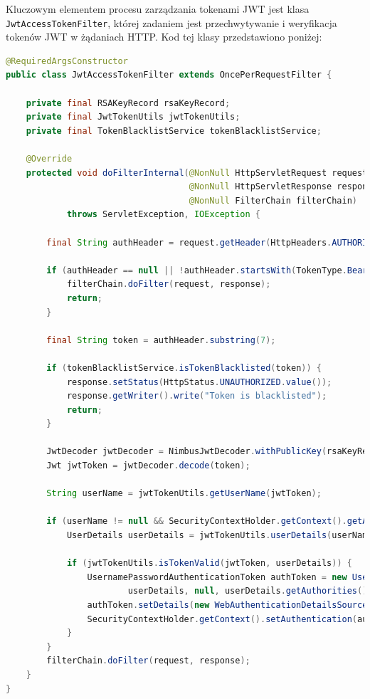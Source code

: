 Kluczowym elementem procesu zarządzania tokenami JWT jest klasa \texttt{JwtAccessTokenFilter}, której zadaniem jest przechwytywanie i weryfikacja tokenów JWT w żądaniach HTTP. Kod tej klasy przedstawiono poniżej:

\begin{lstlisting}[language=Java, style=JavaStyle, caption=Kod niestandardowego filtra \texttt{JwtAccessTokenFilter}]
@RequiredArgsConstructor
public class JwtAccessTokenFilter extends OncePerRequestFilter {

    private final RSAKeyRecord rsaKeyRecord;
    private final JwtTokenUtils jwtTokenUtils;
    private final TokenBlacklistService tokenBlacklistService;

    @Override
    protected void doFilterInternal(@NonNull HttpServletRequest request, 
                                    @NonNull HttpServletResponse response, 
                                    @NonNull FilterChain filterChain) 
            throws ServletException, IOException {

        final String authHeader = request.getHeader(HttpHeaders.AUTHORIZATION);

        if (authHeader == null || !authHeader.startsWith(TokenType.Bearer.name())) {
            filterChain.doFilter(request, response);
            return;
        }

        final String token = authHeader.substring(7);

        if (tokenBlacklistService.isTokenBlacklisted(token)) {
            response.setStatus(HttpStatus.UNAUTHORIZED.value());
            response.getWriter().write("Token is blacklisted");
            return;
        }

        JwtDecoder jwtDecoder = NimbusJwtDecoder.withPublicKey(rsaKeyRecord.publicKey()).build();
        Jwt jwtToken = jwtDecoder.decode(token);

        String userName = jwtTokenUtils.getUserName(jwtToken);

        if (userName != null && SecurityContextHolder.getContext().getAuthentication() == null) {
            UserDetails userDetails = jwtTokenUtils.userDetails(userName);

            if (jwtTokenUtils.isTokenValid(jwtToken, userDetails)) {
                UsernamePasswordAuthenticationToken authToken = new UsernamePasswordAuthenticationToken(
                        userDetails, null, userDetails.getAuthorities());
                authToken.setDetails(new WebAuthenticationDetailsSource().buildDetails(request));
                SecurityContextHolder.getContext().setAuthentication(authToken);
            }
        }
        filterChain.doFilter(request, response);
    }
}
\end{lstlisting}

